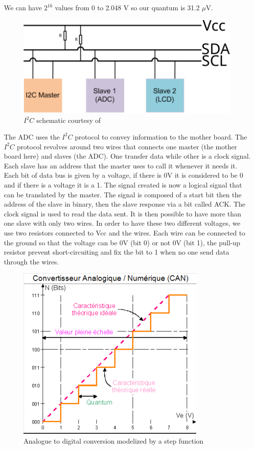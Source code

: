\documentclass{article}[12pt]
\begin{document}
We can have $2^{16}$ values from 0 to 2.048 V so our quantum is 31.2 $\mu$V.
\begin{figure}[H]
    \centering
    \includegraphics[width=.5\textwidth]{figures/i2c_diagram.pdf}
    \caption{$I^2C$ schematic courtesy of \cite{Matworks-2022}}
    \label{fig:i2c_diagram}
\end{figure}
The ADC uses the $I^2C$ protocol to convey information to the mother board. 
The $I^2C$ protocol revolves around two wires that connects one master (the mother board here) and slaves (the ADC). 
One transfer data while other is a clock signal.
Each slave has an address that the master uses to call it whenever it needs it.
Each bit of data bus is given by a voltage, if there is 0V it is considered to be 0 and if there is a voltage it is a 1.
The signal created is now a logical signal that can be translated by the master.
The signal is composed of a start bit then the address of the slave in binary, then the slave response via a bit called ACK.
The clock signal is used to read the data sent.
It is then possible to have more than one slave with only two wires.
In order to have these two different voltages, we use two resistors connected to Vcc and the wires.
Each wire can be connected to the ground so that the voltage can be 0V (bit 0) or not 0V (bit 1), the pull-up resistor prevent short-circuiting and fix the bit to 1 when no one send data through the wires.\cite{nandland-2019}
\begin{figure}[H]
    \centering
    \includegraphics[width=.4\textwidth]{figures/CAN.png}
    \caption{Analogue to digital conversion modelized by a step function \cite{CedricKillian-2020}}
    \label{fig:CAN_step}
\end{figure}
\end{document}
